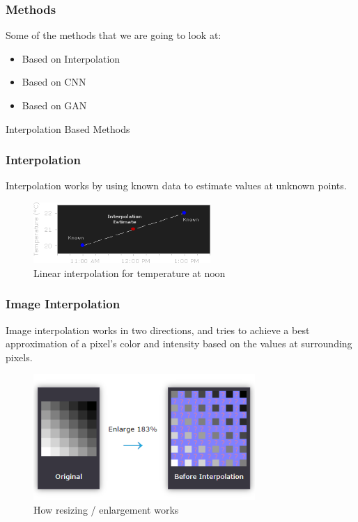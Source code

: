 \documentclass[11pt, presentation]{beamer}
\begin{document}
    \begin{frame}
        \frametitle{Methods}
        Some of the methods that we are going to look at:
        \begin{itemize}
            \item Based on Interpolation
            \item Based on CNN
            \item Based on GAN
        \end{itemize}
    \end{frame}
    \begin{section}{Interpolation Based Methods}
        \begin{frame}
            \frametitle{Interpolation}
            Interpolation works by using known data to estimate values at unknown points.
            \begin{figure}
                \includegraphics[width=0.6\textwidth]{images/interpolation_graph1}
                \caption{Linear interpolation for temperature at noon~\cite{camii}}
                \label{fig:interpolation-linear}
            \end{figure}
        \end{frame}
        \begin{frame}
            \frametitle{Image Interpolation}
            Image interpolation works in two directions, and tries to achieve a best approximation of a pixel's color and intensity based on the values at surrounding pixels.
            \begin{figure}
                \includegraphics[width=0.75\textwidth]{images/image-interpolation}
                \caption{How resizing / enlargement works~\cite{camii}}

\end{figure}
\end{frame}
\end{section}
\end{document}
